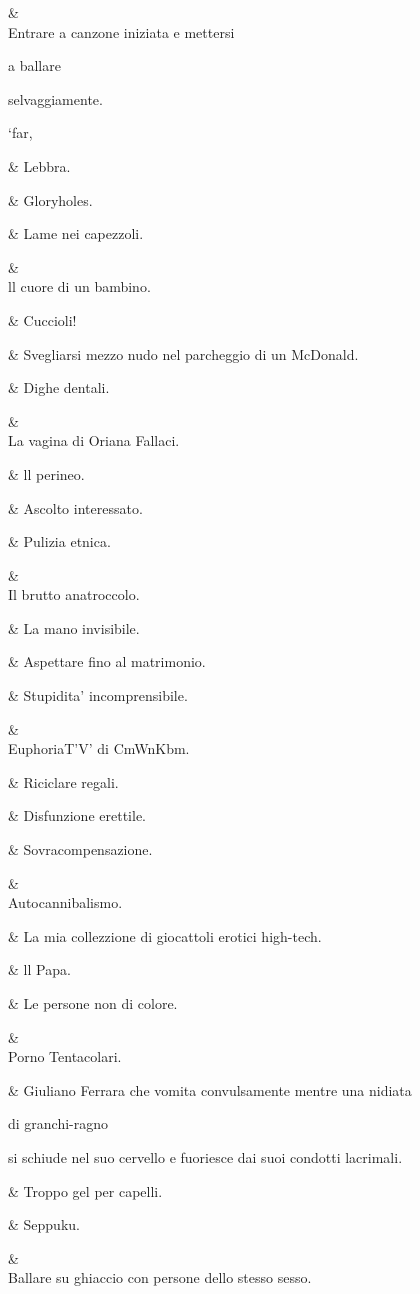 &
\\
Entrare a
canzone iniziata
e mettersi

a ballare

selvaggiamente.

‘far,

&
Lebbra.

&
Gloryholes.

&
Lame nei
capezzoli.

&
\\
ll cuore di un
bambino.

&
Cuccioli!

&
Svegliarsi
mezzo nudo nel
parcheggio di un
McDonald.

&
Dighe dentali.

&
\\
La vagina di
Oriana Fallaci.

&
ll perineo.

&
Ascolto
interessato.

&
Pulizia etnica.

&
\\
Il brutto
anatroccolo.

&
La mano
invisibile.

&
Aspettare fino al
matrimonio.

&
Stupidita’
incomprensibile.

&
\\
EuphoriaT'V' di
CmWnKbm.

&
Riciclare regali.

&
Disfunzione
erettile.

&
Sovracompensazione.

&
\\
Autocannibalismo.

&
La mia
collezzione di
giocattoli erotici
high-tech.

&
ll Papa.

&
Le persone non
di colore.

&
\\
Porno
Tentacolari.

&
Giuliano Ferrara che
vomita convulsamente
mentre una nidiata

di granchi-ragno

si schiude nel suo
cervello e fuoriesce
dai suoi condotti
lacrimali.

&
Troppo gel per
capelli.

&
Seppuku.

&
\\
Ballare su
ghiaccio con
persone dello
stesso sesso.

